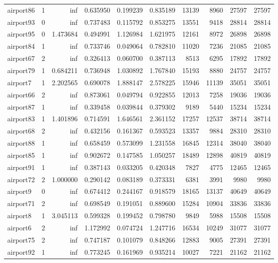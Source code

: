 \begin{longtable}{|l|r|r|r|r|r|r|r|r|r|}
airport86 & 1 & inf & 0.635950 & 0.199239 & 0.835189 & 13139 & 8960 & 27597 & 27597 \\
airport93 & 0 & inf & 0.737483 & 0.115792 & 0.853275 & 13551 & 9418 & 28814 & 28814 \\
airport95 & 0 & 1.473684 & 0.494991 & 1.126984 & 1.621975 & 12161 & 8972 & 26898 & 26898 \\
airport84 & 1 & inf & 0.733746 & 0.049064 & 0.782810 & 11020 & 7236 & 21085 & 21085 \\
airport67 & 2 & inf & 0.326413 & 0.060700 & 0.387113 & 8513 & 6295 & 17892 & 17892 \\
airport79 & 1 & 0.684211 & 0.736948 & 1.030892 & 1.767840 & 15193 & 8880 & 24757 & 24757 \\
airport7 & 1 & 2.202565 & 0.690078 & 1.888147 & 2.578225 & 15946 & 11139 & 35051 & 35051 \\
airport66 & 2 & inf & 0.873061 & 0.049794 & 0.922855 & 12013 & 7258 & 19036 & 19036 \\
airport87 & 1 & inf & 0.339458 & 0.039844 & 0.379302 & 9189 & 5440 & 15234 & 15234 \\
airport83 & 1 & 1.401896 & 0.714591 & 1.646561 & 2.361152 & 17257 & 12537 & 38714 & 38714 \\
airport68 & 2 & inf & 0.432156 & 0.161367 & 0.593523 & 13357 & 9884 & 28310 & 28310 \\
airport88 & 1 & inf & 0.658459 & 0.573099 & 1.231558 & 16845 & 12314 & 38040 & 38040 \\
airport85 & 1 & inf & 0.902672 & 0.147585 & 1.050257 & 18489 & 12898 & 40819 & 40819 \\
airport91 & 1 & inf & 0.387143 & 0.033205 & 0.420348 & 7827 & 4775 & 12465 & 12465 \\
airport72 & 2 & 1.000000 & 0.290142 & 0.083189 & 0.373331 & 6381 & 3991 & 9980 & 9980 \\
airport9 & 0 & inf & 0.674412 & 0.244167 & 0.918579 & 18165 & 13137 & 40649 & 40649 \\
airport71 & 2 & inf & 0.698549 & 0.191051 & 0.889600 & 15284 & 10904 & 33836 & 33836 \\
airport8 & 1 & 3.045113 & 0.599328 & 0.199452 & 0.798780 & 9849 & 5988 & 15508 & 15508 \\
airport6 & 2 & inf & 1.172992 & 0.074724 & 1.247716 & 16534 & 10249 & 31077 & 31077 \\
airport75 & 2 & inf & 0.747187 & 0.101079 & 0.848266 & 12883 & 9005 & 27391 & 27391 \\
airport92 & 1 & inf & 0.773245 & 0.161969 & 0.935214 & 10027 & 7221 & 21162 & 21162 \\

\end{longtable}
